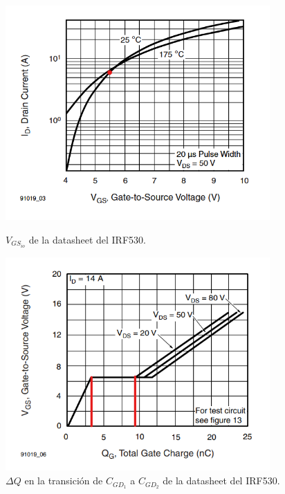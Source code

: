 \begin{figure}[H]
	\centering
	\begin{minipage}{0.4\textwidth}
		\centering
		\includegraphics[width=0.9\textwidth]{ImagenesEjercicio-1/Vgs-Id_LI} %
		\caption{$V_{GS_{io}}$ de la datasheet del IRF530.}
		\label{ej1:fig:vgsio}
	\end{minipage}\hfill
	\begin{minipage}{0.4\textwidth}
		\centering
		\includegraphics[width=0.9\textwidth]{ImagenesEjercicio-1/deltaq} %
		\caption{$\Delta Q$ en la transición de $C_{GD_1}$ a $C_{GD_2}$ de la datasheet del IRF530.}
		\label{ej1:fig:deltaq}
	\end{minipage}\hfill
\end{figure}

